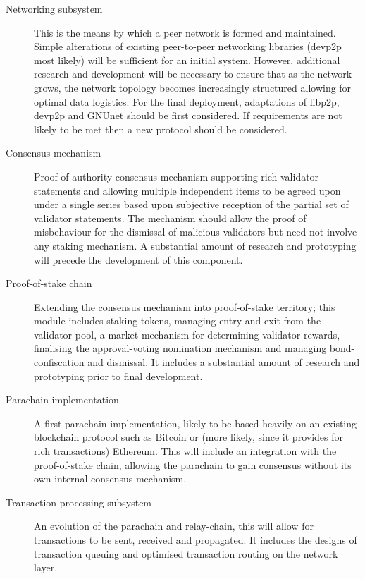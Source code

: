 \begin{description}

\item[Networking subsystem] This is the means by which a peer network is formed and maintained. Simple alterations of existing peer-to-peer networking libraries (devp2p most likely) will be sufficient for an initial system. However, additional research and development will be necessary to ensure that as the network grows, the network topology becomes increasingly structured allowing for optimal data logistics. For the final deployment, adaptations of libp2p, devp2p and GNUnet should be first considered. If requirements are not likely to be met then a new protocol should be considered.

\item[Consensus mechanism] Proof-of-authority consensus mechanism supporting rich validator statements and allowing multiple independent items to be agreed upon under a single series based upon subjective reception of the partial set of validator statements. The mechanism should allow the proof of misbehaviour for the dismissal of malicious validators but need not involve any staking mechanism. A substantial amount of research and prototyping will precede the development of this component.

\item[Proof-of-stake chain] Extending the consensus mechanism into proof-of-stake territory; this module includes  staking tokens, managing entry and exit from the validator pool, a market mechanism for determining validator rewards, finalising the approval-voting nomination mechanism and managing bond-confiscation and dismissal. It includes a substantial amount of research and prototyping prior to final development.

\item[Parachain implementation] A first parachain implementation, likely to be based heavily on an existing blockchain protocol such as Bitcoin or (more likely, since it provides for rich transactions) Ethereum. This will include an integration with the proof-of-stake chain, allowing the parachain to gain consensus without its own internal consensus mechanism.

\item[Transaction processing subsystem] An evolution of the parachain and relay-chain, this will allow for transactions to be sent, received and propagated. It includes the designs of transaction queuing and optimised transaction routing on the network layer.


\end{description}
